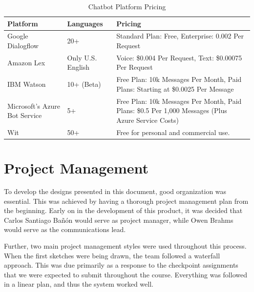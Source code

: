 \documentclass[titlepage, 12pt]{article}
\begin{document}
\begin{center}
\begin{table}[h]
\centering
\caption{Chatbot Platform Pricing}
    \begin{tabular}{ L{2cm} L{3cm} L{4.5cm} }
    
        \toprule
        \textbf{Platform} & \textbf{Languages} & \textbf{Pricing} \\

        \midrule
        Google Dialogflow & 20+ & Standard Plan: Free, Enterprise: 0.002 Per Request \\

        \midrule 
        Amazon Lex & Only U.S. English & Voice: \$0.004 Per Request, Text: \$0.00075 Per Request \\

        \midrule
        IBM Watson & 10+ (Beta) & Free Plan: 10k Messages Per Month, Paid Plans: Starting at \$0.0025 Per Message \\

        \midrule
        Microsoft’s Azure Bot Service & 5+ & Free Plan: 10k Messages Per Month, Paid Plans: \$0.5 Per 1,000 Messages (Plus Azure Service Costs) \\

        \midrule
        Wit & 50+ & Free for personal and commercial use. \\

        \bottomrule
        
    \end{tabular}
    
\end{table}
\end{center}

\pagebreak
\section{Project Management}

To develop the designs presented in this document, good organization was essential. This was achieved by having a thorough project management plan from the beginning. Early on in the development of this product, it was decided that Carlos Santiago Bañón would serve as project manager, while Owen Brahms would serve as the communications lead.

Further, two main project management styles were used throughout this process. When the first sketches were being drawn, the team followed a waterfall approach. This was due primarily as a response to the checkpoint assignments that we were expected to submit throughout the course. Everything was followed in a linear plan, and thus the system worked well.
\end{document}
